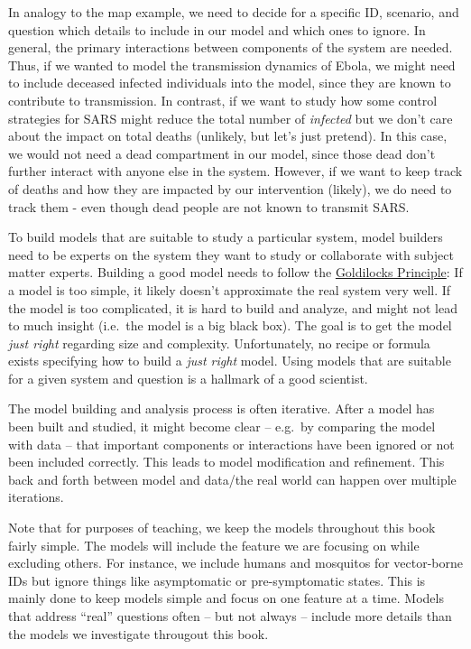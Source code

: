 \documentclass[]{book}
\theoremstyle{definition}
\theoremstyle{definition}
\theoremstyle{definition}
\theoremstyle{remark}
\begin{document}
In analogy to the map example, we need to decide for a specific ID,
scenario, and question which details to include in our model and which
ones to ignore. In general, the primary interactions between components
of the system are needed. Thus, if we wanted to model the transmission
dynamics of Ebola, we might need to include deceased infected
individuals into the model, since they are known to contribute to
transmission. In contrast, if we want to study how some control
strategies for SARS might reduce the total number of \emph{infected} but
we don't care about the impact on total deaths (unlikely, but let's just
pretend). In this case, we would not need a dead compartment in our
model, since those dead don't further interact with anyone else in the
system. However, if we want to keep track of deaths and how they are
impacted by our intervention (likely), we do need to track them - even
though dead people are not known to transmit SARS.

To build models that are suitable to study a particular system, model
builders need to be experts on the system they want to study or
collaborate with subject matter experts. Building a good model needs to
follow the
\href{https://en.wikipedia.org/wiki/Goldilocks_principle}{Goldilocks
Principle}: If a model is too simple, it likely doesn't approximate the
real system very well. If the model is too complicated, it is hard to
build and analyze, and might not lead to much insight (i.e.~the model is
a big black box). The goal is to get the model \emph{just right}
regarding size and complexity. Unfortunately, no recipe or formula
exists specifying how to build a \emph{just right} model. Using models
that are suitable for a given system and question is a hallmark of a
good scientist.

The model building and analysis process is often iterative. After a
model has been built and studied, it might become clear -- e.g.~by
comparing the model with data -- that important components or
interactions have been ignored or not been included correctly. This
leads to model modification and refinement. This back and forth between
model and data/the real world can happen over multiple iterations.

Note that for purposes of teaching, we keep the models throughout this
book fairly simple. The models will include the feature we are focusing
on while excluding others. For instance, we include humans and mosquitos
for vector-borne IDs but ignore things like asymptomatic or
pre-symptomatic states. This is mainly done to keep models simple and
focus on one feature at a time. Models that address ``real'' questions
often -- but not always -- include more details than the models we
investigate througout this book.
\end{document}
